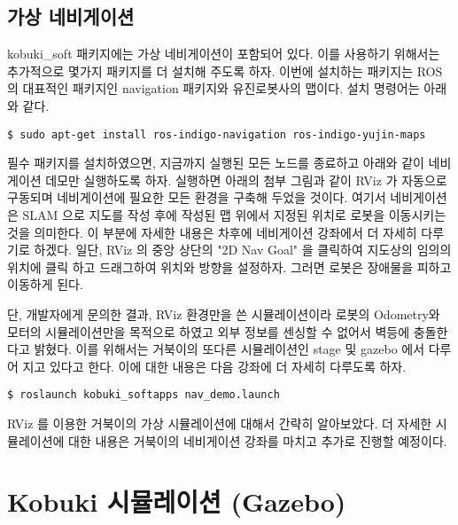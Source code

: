 \subsection{가상 네비게이션}

kobuki\_soft 패키지에는 가상 네비게이션이 포함되어 있다. 이를 사용하기 위해서는 추가적으로 몇가지 패키지를 더 설치해 주도록 하자. 이번에 설치하는 패키지는 ROS 의 대표적인 패키지인 navigation 패키지와 유진로봇사의 맵이다. 설치 명령어는 아래와 같다.

\vspace{\baselineskip}
\begin{lstlisting}[language=ROS]
$ sudo apt-get install ros-indigo-navigation ros-indigo-yujin-maps
\end{lstlisting}

필수 패키지를 설치하였으면, 지금까지 실행된 모든 노드를 종료하고 아래와 같이 네비게이션 데모만 실행하도록 하자. 실행하면 아래의 첨부 그림과 같이 RViz 가 자동으로 구동되며 네비게이션에 필요한 모든 환경을 구축해 두었을 것이다. 여기서 네비게이션은 SLAM 으로 지도를 작성 후에  작성된 맵 위에서 지정된 위치로 로봇을 이동시키는 것을 의미한다. 이 부분에 자세한 내용은 차후에 네비게이션 강좌에서 더 자세히 다루기로 하겠다. 일단, RViz 의 중앙 상단의 "2D Nav Goal" 을 클릭하여 지도상의 임의의 위치에 클릭 하고 드래그하여 위치와 방향을 설정하자. 그러면 로봇은 장애물을 피하고 이동하게 된다. 

단, 개발자에게 문의한 결과, RViz 환경만을 쓴 시뮬레이션이라 로봇의 Odometry와 모터의 시뮬레이션만을 목적으로 하였고 외부 정보를 센싱할 수 없어서 벽등에 충돌한다고 밝혔다. 이를 위해서는 거북이의 또다른 시뮬레이션인 stage 및 gazebo 에서 다루어 지고 있다고 한다. 이에 대한 내용은 다음 강좌에 더 자세히 다루도록 하자.

\vspace{\baselineskip}
\begin{lstlisting}[language=ROS]
$ roslaunch kobuki_softapps nav_demo.launch
\end{lstlisting}

RViz 를 이용한 거북이의 가상 시뮬레이션에 대해서 간략히 알아보았다. 더 자세한 시뮬레이션에 대한 내용은 거북이의 네비게이션 강좌를 마치고 추가로 진행할 예정이다.

\section{Kobuki 시뮬레이션 (Gazebo)}

